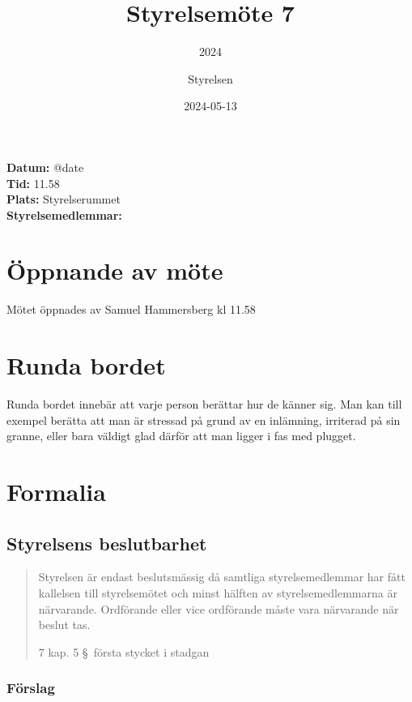 \documentclass[protokoll]{dvd}
\begin{document}
\title{Styrelsemöte 7}
\subtitle{2024}
\author{Styrelsen}
\date{2024-05-13}


\textbf{Datum:} \csname @date\endcsname\\
\textbf{Tid:} 11.58\\
\textbf{Plats:} Styrelserummet\\
\textbf{Styrelsemedlemmar:}
\begin{närvarande_förtroendevalda}
\end{närvarande_förtroendevalda}

\section{Öppnande av möte}

Mötet öppnades av Samuel Hammersberg kl 11.58

\section{Runda bordet}

Runda bordet innebär att varje person berättar hur de känner sig.
Man kan till exempel berätta att man är stressad på grund av en inlämning, irriterad på sin granne, eller bara väldigt glad därför att man ligger i fas med plugget.

\section{Formalia}

\subsection{Styrelsens beslutbarhet}

\blockquote[7 kap. 5 \S~första stycket i stadgan][]{%
    Styrelsen är endast beslutsmässig då samtliga styrelsemedlemmar har fått kallelsen till styrelsemötet och minst hälften av styrelsemedlemmarna är närvarande.
    Ordförande eller vice ordförande måste vara närvarande när beslut tas.
}

\subsubsection*{Förslag}
\end{document}
